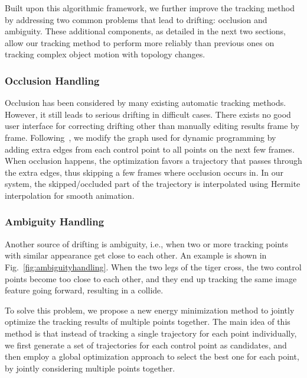 Built upon this algorithmic framework, we further improve the tracking method by addressing two common problems that lead to drifting: occlusion and ambiguity. These additional components, as detailed in the next two sections, allow our tracking method to perform more reliably than previous ones on tracking complex object motion with topology changes. 


\subsubsection{Occlusion Handling}
Occlusion has been considered by many existing automatic tracking methods. However, it still leads to serious drifting in difficult cases. There exists no good user interface for correcting drifting other than manually editing results frame by frame.
Following~\cite{Amberg:2011}, we modify the graph used for dynamic programming by adding extra edges from each control point to all points on the next few frames. When occlusion happens, the optimization favors a trajectory that passes through the extra edges, thus skipping a few frames where occlusion occurs in.
In our system, the skipped/occluded part of the trajectory is interpolated using Hermite interpolation for smooth animation. 


\subsubsection{Ambiguity Handling}\label{sec:ambi}

Another source of drifting is ambiguity, i.e., when two or more tracking points with similar appearance get close to each other. An example is shown in Fig.~\ref{fig:ambiguityhandling}. When the two legs of the tiger cross, the two control points become too close to each other, and they end up tracking the same image feature going forward, resulting in a collide.  

To solve this problem, we propose a new energy minimization method to jointly optimize the tracking results of multiple points together. 
The main idea of this method is that instead of tracking a single trajectory for each point individually, we first generate a set of trajectories for each control point as candidates, and then employ a global optimization approach to select the best one for each point, by jointly considering multiple points together.

